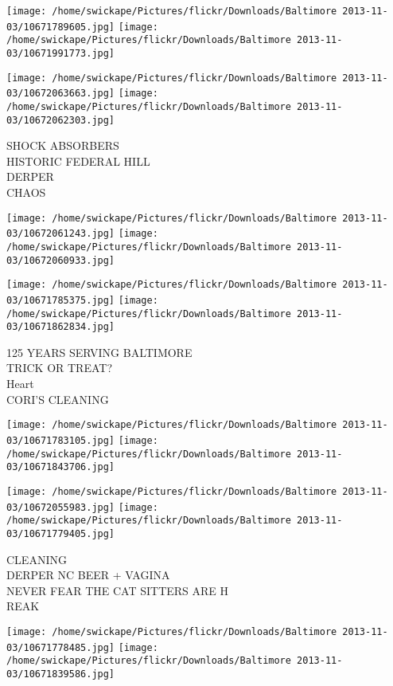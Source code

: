 \documentclass[10pt,letterpaper]{article}
\begin{document}
\texttt{[image: /home/swickape/Pictures/flickr/Downloads/Baltimore 2013-11-03/10671789605.jpg]}
\texttt{[image: /home/swickape/Pictures/flickr/Downloads/Baltimore 2013-11-03/10671991773.jpg]}

\texttt{[image: /home/swickape/Pictures/flickr/Downloads/Baltimore 2013-11-03/10672063663.jpg]}
\texttt{[image: /home/swickape/Pictures/flickr/Downloads/Baltimore 2013-11-03/10672062303.jpg]}

SHOCK ABSORBERS\\
HISTORIC FEDERAL HILL\\
DERPER\\
CHAOS\\
\pagebreak

\texttt{[image: /home/swickape/Pictures/flickr/Downloads/Baltimore 2013-11-03/10672061243.jpg]}
\texttt{[image: /home/swickape/Pictures/flickr/Downloads/Baltimore 2013-11-03/10672060933.jpg]}

\texttt{[image: /home/swickape/Pictures/flickr/Downloads/Baltimore 2013-11-03/10671785375.jpg]}
\texttt{[image: /home/swickape/Pictures/flickr/Downloads/Baltimore 2013-11-03/10671862834.jpg]}

125 YEARS SERVING BALTIMORE\\
TRICK OR TREAT?\\
Heart\\
CORI'S CLEANING\\
\pagebreak

\texttt{[image: /home/swickape/Pictures/flickr/Downloads/Baltimore 2013-11-03/10671783105.jpg]}
\texttt{[image: /home/swickape/Pictures/flickr/Downloads/Baltimore 2013-11-03/10671843706.jpg]}

\texttt{[image: /home/swickape/Pictures/flickr/Downloads/Baltimore 2013-11-03/10672055983.jpg]}
\texttt{[image: /home/swickape/Pictures/flickr/Downloads/Baltimore 2013-11-03/10671779405.jpg]}

CLEANING\\
DERPER NC BEER + VAGINA\\
NEVER FEAR THE CAT SITTERS ARE H\\
REAK\\
\pagebreak

\texttt{[image: /home/swickape/Pictures/flickr/Downloads/Baltimore 2013-11-03/10671778485.jpg]}
\texttt{[image: /home/swickape/Pictures/flickr/Downloads/Baltimore 2013-11-03/10671839586.jpg]}
\end{document}
